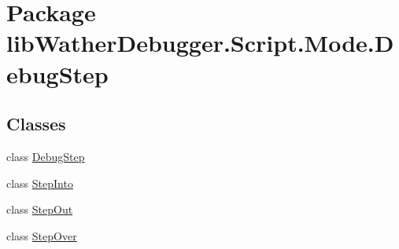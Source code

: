\hypertarget{namespacelib_wather_debugger_1_1_script_1_1_mode_1_1_debug_step}{\section{Package lib\+Wather\+Debugger.\+Script.\+Mode.\+Debug\+Step}
\label{namespacelib_wather_debugger_1_1_script_1_1_mode_1_1_debug_step}
}
\subsection*{Classes}
\begin{DoxyCompactItemize}
\item 
class \hyperlink{classlib_wather_debugger_1_1_script_1_1_mode_1_1_debug_step_1_1_debug_step}{Debug\+Step}
\item 
class \hyperlink{classlib_wather_debugger_1_1_script_1_1_mode_1_1_debug_step_1_1_step_into}{Step\+Into}
\item 
class \hyperlink{classlib_wather_debugger_1_1_script_1_1_mode_1_1_debug_step_1_1_step_out}{Step\+Out}
\item 
class \hyperlink{classlib_wather_debugger_1_1_script_1_1_mode_1_1_debug_step_1_1_step_over}{Step\+Over}
\end{DoxyCompactItemize}
